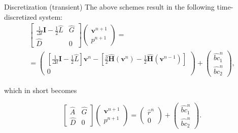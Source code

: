 \documentclass{beamer}
\begin{document}
	\begin{frame}{Discretization (transient)}
	The above schemes result in the following time-discretized system:
	\begin{multline}
		\begin{bmatrix}
			\frac{1}{\Delta t}\mathbf{I}-\frac{1}{2}\hat{L} & \hat{G} \\
			\hat{D} & 0
		\end{bmatrix}
		\begin{pmatrix}
			\boldsymbol{v}^{n+1} \\ 
			p^{n+1}
		\end{pmatrix}=\\
		=
		\begin{pmatrix}
			\left[\frac{1}{\Delta t}\mathbf{I}-\frac{1}{2}\hat{L}\right] \boldsymbol{v}^n - \left[\frac{3}{2}\hat{\mathbf{H}}(\boldsymbol{v}^n) - \frac{1}{2}\hat{\mathbf{H}}(\boldsymbol{v}^{n-1})\right]\\
			0
		\end{pmatrix}
		+
		\begin{pmatrix}
			\hat{bc}_1^n\\
			\hat{bc}_2^n
		\end{pmatrix},
	\end{multline}	
	
	which in short becomes
	
	\begin{equation}\label{eqn:NSE-dsm-bl-system-nonint}
	\boxed{\begin{bmatrix}
		\hat{A} & \hat{G} \\
		\hat{D} & 0
	\end{bmatrix}
	\begin{pmatrix}
		\boldsymbol{v}^{n+1} \\ 
		p^{n+1}
	\end{pmatrix}
	=
	\begin{pmatrix}
		\hat{r}^n \\
		0
	\end{pmatrix}
	+
	\begin{pmatrix}
		\hat{bc}_1^n\\
		\hat{bc}_2^n
	\end{pmatrix}}.
	\end{equation}
	\end{frame}

	
	
\end{document}
